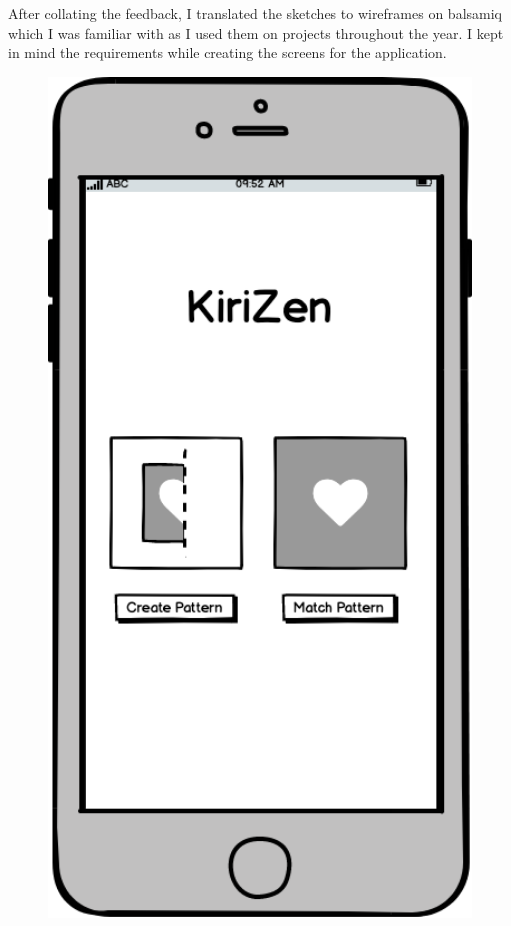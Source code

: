 \documentclass[11pt]{article}
\begin{document}
    
    After collating the feedback, I translated the sketches to wireframes on balsamiq which I was familiar with as I used them on projects throughout the year. %
    I kept in mind the requirements while creating the screens for the application.
\clearpage
             \begin{figure}
                \begin{minipage}[c]{0.35\textwidth}
                \includegraphics[width=1\textwidth]{Images/Prototype/prototypeHomeScreen.png}

\end{minipage}
\end{figure}
\end{document}
